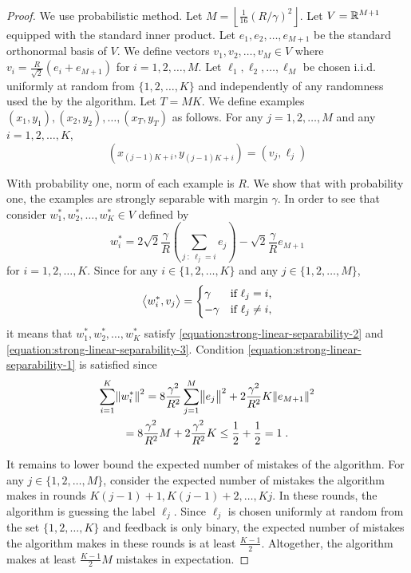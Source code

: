 \begin{proof}
We use probabilistic method. Let $M = \left\lfloor \frac{1}{16} (R/\gamma)^2
\right\rfloor$. Let $V = \mathbb{R}^{M+1}$ equipped with the standard inner product.
Let $e_1, e_2, \dots, e_{M+1}$ be the standard orthonormal basis of $V$. We
define vectors $v_1, v_2, \dots, v_M \in V$ where $v_i = \frac{R}{\sqrt{2}}(e_i
+ e_{M+1})$ for $i=1,2,\dots,M$. Let $\ell_1, \ell_2, \dots, \ell_M$ be chosen
i.i.d. uniformly at random from $\{1,2,\dots,K\}$ and independently of any
randomness used the by the algorithm. Let $T = M K$. We define examples $(x_1,
y_1), (x_2, y_2), \dots, (x_T, y_T)$ as follows. For any $j=1,2,\dots,M$ and any
$i=1,2,\dots,K$,
$$
(x_{(j-1)K + i}, y_{(j-1)K + i}) = (v_j, \ell_j)
$$


With probability one, norm of each example is $R$. We show that with probability
one, the examples are strongly separable with margin $\gamma$. In order to see
that consider $w_1^*, w_2^*, \dots, w_K^* \in V$ defined by
$$
w_i^* = 2 \sqrt{2} \frac{\gamma}{R} \left( \sum_{j ~:~ \ell_j = i} e_j \right) - \sqrt{2} \frac{\gamma}{R} e_{M+1}
$$
for $i=1,2,\dots,K$. Since for any $i \in \{1,2,\dots,K\}$ and any $j \in
\{1,2,\dots,M\}$,
$$
\left\langle w_i^*, v_j \right\rangle =
\begin{cases}
\gamma & \text{if $\ell_j = i$,} \\
- \gamma & \text{if $\ell_j \neq i$,}
\end{cases}
$$
it means that $w_1^*, w_2^*, \dots, w_K^*$ satisfy
\eqref{equation:strong-linear-separability-2} and
\eqref{equation:strong-linear-separability-3}. Condition \eqref{equation:strong-linear-separability-1}
is satisfied since
\begin{multline*}
\sum_{i=1}^K \norm{w_i^*}^2
= 8 \frac{\gamma^2}{R^2} \sum_{j=1}^M \norm{e_j}^2 + 2 \frac{\gamma^2}{R^2} K \norm{e_{M+1}}^2 \\
= 8 \frac{\gamma^2}{R^2} M + 2 \frac{\gamma^2}{R^2} K
\le \frac{1}{2} + \frac{1}{2}
= 1 \; .
\end{multline*}

It remains to lower bound the expected number of mistakes of the algorithm. For
any $j \in \{1,2,\dots,M\}$, consider the expected number of mistakes the
algorithm makes in rounds $K(j-1) + 1, K(j-1) + 2, \dots, Kj$. In these rounds,
the algorithm is guessing the label $\ell_j$. Since $\ell_j$ is chosen uniformly
at random from the set $\{1,2,\dots,K\}$ and feedback is only binary, the
expected number of mistakes the algorithm makes in these rounds is at least
$\frac{K-1}{2}$. Altogether, the algorithm makes at least $\frac{K-1}{2} M$
mistakes in expectation.


\end{proof}
